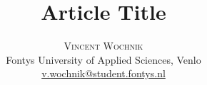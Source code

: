 \documentclass[twoside]{article}
\title{\vspace{-15mm}\fontsize{24pt}{10pt}\selectfont\textbf{Article Title}}
\author{
\large
\textsc{Vincent Wochnik}\\[2mm]
\normalsize Fontys University of Applied Sciences, Venlo \\
\normalsize \href{mailto:v.wochnik@student.fontys.nl}{v.wochnik@student.fontys.nl}
\vspace{-5mm}
}
\date{}
\begin{document}
\maketitle
\thispagestyle{fancy}

\begin{abstract}

\end{abstract}

\begin{multicols}{2}





\begin{thebibliography}{99}

\end{thebibliography}
\end{multicols}
\end{document}
